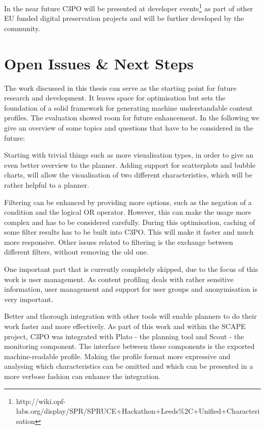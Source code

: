 In the near future C3PO will be presented at developer events\footnote{http://wiki.opf-labs.org/display/SPR/SPRUCE+Hackathon+Leeds\%2C+Unified+Characterisation} as part of other EU funded digital preservation projects and will be further developed by the community.

% 

\section{Open Issues \& Next Steps}
The work discussed in this thesis can serve as the starting point for future research and development.
It leaves space for optimisation but sets the foundation of a solid framework for generating machine understandable content profiles. The evaluation showed room for future enhancement. In the following we give an overview of some topics and questions that have to be considered in the future:

Starting with trivial things such as more visualisation types, in order to give an even better overview to the planner. Adding support for scatterplots and bubble charts, will allow the visualisation of two different characteristics, which will be rather helpful to a planner.

Filtering can be enhanced by providing more options, such as the negation of a condition and the logical OR operator. However, this can make the usage more complex and has to be considered carefully. During this optimisation, caching of some filter results has to be built into C3PO. This will make it faster and much more responsive.
Other issues related to filtering is the exchange between different filters, without removing the old one.

One important part that is currently completely skipped, due to the focus of this work is user management. As content profiling deals with rather sensitive information, user management and support for user groups and anonymisation is very important.

Better and thorough integration with other tools will enable planners to do their work faster and more effectively. As part of this work and within the SCAPE project, C3PO was integrated with Plato - the planning tool and Scout - the monitoring component. The interface between these components is the exported machine-readable profile. Making the profile format more expressive and analysing which characteristics can be omitted and which can be presented in a more verbose fashion can enhance the integration.

